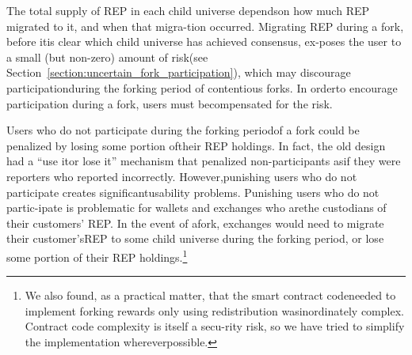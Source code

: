 \documentclass[12pt,floatfix,reprint,nofootinbib,amsmath,amssymb,epsfig,pre,floats,letterpaper,groupedaffiliation]{revtex4-1}
\theoremstyle{definition}
\theoremstyle{definition}
\begin{document}
The total supply of REP in each child universe depends\linebreak on how much REP migrated to it, and when that migra-\linebreak tion occurred. Migrating REP during a fork, before it\linebreak is clear which child universe has achieved consensus, ex-\linebreak poses the user to a small (but non-zero) amount of risk\linebreak (see Section~\ref{section:uncertain_fork_participation}), which may discourage participation\linebreak during the forking period of contentious forks. In order\linebreak to encourage participation during a fork, users must be\linebreak compensated for the risk.

Users who do not participate during the forking period\linebreak of a fork could be penalized by losing some portion of\linebreak their REP holdings. In fact, the old design had a ``use it\linebreak or lose it'' mechanism that penalized non-participants as\linebreak if they were reporters who reported incorrectly. However,\linebreak punishing users who do not participate creates significant\linebreak usability problems. Punishing users who do not partic-\linebreak ipate is problematic for wallets and exchanges who are\linebreak the custodians of their customers' REP. In the event of a\linebreak fork, exchanges would need to migrate their customer's\linebreak \enlargethispage*{1\baselineskip}REP to some child universe during the forking period, or \linebreak lose some portion of their REP holdings.\footnote{We also found, as a practical matter, that the smart contract code\linebreak needed to implement forking rewards only using redistribution was\linebreak inordinately complex. Contract code complexity is itself a secu-\linebreak rity risk, so we have tried to simplify the implementation wherever\linebreak possible.}
\end{document}
